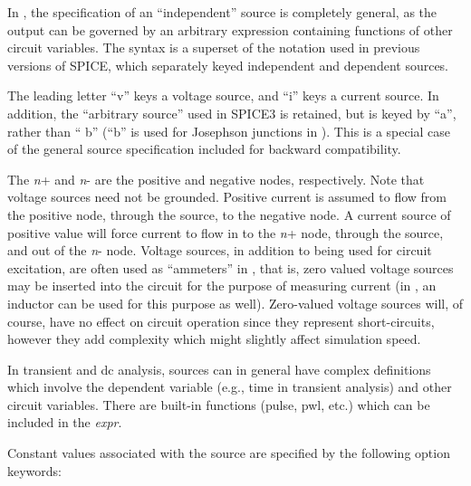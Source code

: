 In {\WRspice}, the specification of an ``independent'' source is
completely general, as the output can be governed by an arbitrary
expression containing functions of other circuit variables.  The
syntax is a superset of the notation used in previous versions of
SPICE, which separately keyed independent and dependent sources.

The leading letter ``{\vt v}'' keys a voltage source, and ``{\vt i}''
keys a current source.  In addition, the ``arbitrary source'' used in
SPICE3 is retained, but is keyed by ``{\vt a}'', rather than ``{\vt
b}'' (``{\vt b}'' is used for Josephson junctions in {\WRspice}). 
This is a special case of the general source specification included
for backward compatibility.

The {\it n\/}{\vt +} and {\it n\/}{\vt -} are the positive and
negative nodes, respectively.  Note that voltage sources need not be
grounded.  Positive current is assumed to flow from the positive
node, through the source, to the negative node.  A current source of
positive value will force current to flow in to the {\it n\/}{\vt +}
node, through the source, and out of the {\it n\/}{\vt -} node. 
Voltage sources, in addition to being used for circuit excitation,
are often used as ``ammeters'' in {\WRspice}, that is, zero valued
voltage sources may be inserted into the circuit for the purpose of
measuring current (in {\WRspice}, an inductor can be used for this
purpose as well).  Zero-valued voltage sources will, of course, have
no effect on circuit operation since they represent short-circuits,
however they add complexity which might slightly affect simulation
speed.

In transient and dc analysis, sources can in general have complex
definitions which involve the dependent variable (e.g., time in
transient analysis) and other circuit variables.  There are built-in
functions ({\vt pulse}, {\vt pwl}, etc.) which can be included in the
{\it expr}.

Constant values associated with the source are specified by
the following option keywords:

